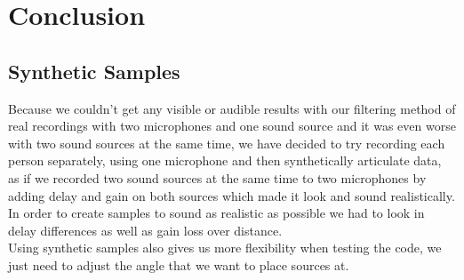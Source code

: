 \chapter{Conclusion}\label{ch:conclusion}

\section{Synthetic Samples}
  Because we couldn't get any visible or audible results with our filtering method of real recordings with two 
microphones and one sound source and it was even worse with two sound sources at the same time, we have 
decided to try recording each person separately, using one microphone and then synthetically articulate data, 
as if we recorded two sound sources at the same time to two microphones by adding delay and gain on both 
sources which made it look and sound realistically.\\
  In order to create samples to sound as realistic as possible we had to look in delay differences as well as 
gain loss over distance. \\


  Using synthetic samples also gives us more flexibility when testing the code, we just need to adjust the 
angle that we want to place sources at. 
